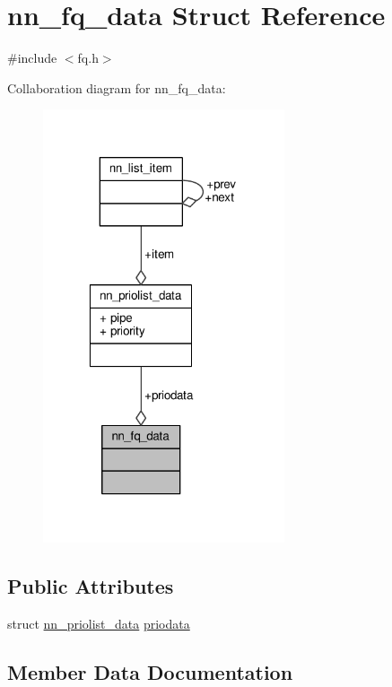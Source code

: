 \hypertarget{structnn__fq__data}{}\section{nn\+\_\+fq\+\_\+data Struct Reference}
\label{structnn__fq__data}


{\ttfamily \#include $<$fq.\+h$>$}



Collaboration diagram for nn\+\_\+fq\+\_\+data\+:\nopagebreak
\begin{figure}[H]
\begin{center}
\leavevmode
\includegraphics[width=202pt]{structnn__fq__data__coll__graph}
\end{center}
\end{figure}
\subsection*{Public Attributes}
\begin{DoxyCompactItemize}
\item 
struct \hyperlink{structnn__priolist__data}{nn\+\_\+priolist\+\_\+data} \hyperlink{structnn__fq__data_a404fcb98abd11c3e90edf6ca0b294432}{priodata}
\end{DoxyCompactItemize}


\subsection{Member Data Documentation}
